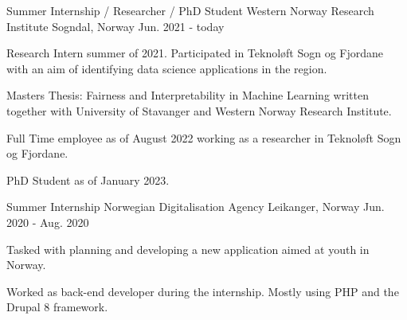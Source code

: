 

\begin{cventries}

\cventry
    {Summer Internship / Researcher / PhD Student} %
    {Western Norway Research Institute} %
    {Sogndal, Norway} %
    {Jun. 2021 - today} %
    {
      \begin{cvitems} %
        \item {Research Intern summer of 2021. Participated in Teknoløft Sogn og Fjordane with an aim of identifying data science applications in the region.}
        \item {Masters Thesis: Fairness and Interpretability in Machine Learning written together with University of Stavanger and Western Norway Research Institute.}
        \item {Full Time employee as of August 2022 working as a researcher in Teknoløft Sogn og Fjordane.}
        \item {PhD Student as of January 2023.}
      \end{cvitems}
    }


  \cventry
    {Summer Internship} %
    {Norwegian Digitalisation Agency} %
    {Leikanger, Norway} %
    {Jun. 2020 - Aug. 2020} %
    {
      \begin{cvitems} %
        \item {Tasked with planning and developing a new application aimed at youth in Norway.}
        \item {Worked as back-end developer during the internship. Mostly using PHP and the Drupal 8 framework.}
      \end{cvitems}
    }


\end{cventries}
